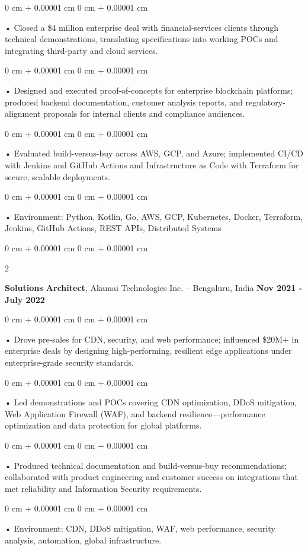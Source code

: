 \documentclass[10pt, letterpaper]{article}
\newenvironment{onecolentry}{
    \begin{adjustwidth}{
        0 cm + 0.00001 cm
    }{
        0 cm + 0.00001 cm
    }
}{
    \end{adjustwidth}
} %
\newenvironment{twocolentry}[2][]{
    \onecolentry
    \def\secondColumn{#2}
    \setcolumnwidth{\fill, 4.5 cm}
    \begin{paracol}{2}
}{
    \switchcolumn \raggedleft \secondColumn
    \end{paracol}
    \endonecolentry
} %
\begin{document}
        \begin{onecolentry}
             • Closed a \$4 million enterprise deal with financial-services clients through technical demonstrations, translating specifications into working POCs and integrating third-party and cloud services.
        \end{onecolentry}
        \begin{onecolentry}
             • Designed and executed proof-of-concepts for enterprise blockchain platforms; produced backend documentation, customer analysis reports, and regulatory-alignment proposals for internal clients and compliance audiences.
        \end{onecolentry}
        \begin{onecolentry}
             • Evaluated build-versus-buy across AWS, GCP, and Azure; implemented CI/CD with Jenkins and GitHub Actions and Infrastructure as Code with Terraform for secure, scalable deployments.
        \end{onecolentry}
        \begin{onecolentry}
             • Environment: Python, Kotlin, Go, AWS, GCP, Kubernetes, Docker, Terraform, Jenkins, GitHub Actions, REST APIs, Distributed Systems
        \end{onecolentry}
        \vspace{0.1cm}

        \begin{twocolentry}{
            \textbf{Nov 2021 - July 2022}
        }
            \textbf{Solutions Architect}, Akamai Technologies Inc. -- Bengaluru, India \end{twocolentry}
        \begin{onecolentry}
            • Drove pre-sales for CDN, security, and web performance; influenced \$20M+ in enterprise deals by designing high-performing, resilient edge applications under enterprise-grade security standards.
        \end{onecolentry}
        \begin{onecolentry}
            • Led demonstrations and POCs covering CDN optimization, DDoS mitigation, Web Application Firewall (WAF), and backend resilience---performance optimization and data protection for global platforms.
        \end{onecolentry}
        \begin{onecolentry}
             • Produced technical documentation and build-versus-buy recommendations; collaborated with product engineering and customer success on integrations that met reliability and Information Security requirements.
        \end{onecolentry}
        \begin{onecolentry}
             • Environment: CDN, DDoS mitigation, WAF, web performance, security analysis, automation, global infrastructure.
        \end{onecolentry}
\end{document}
